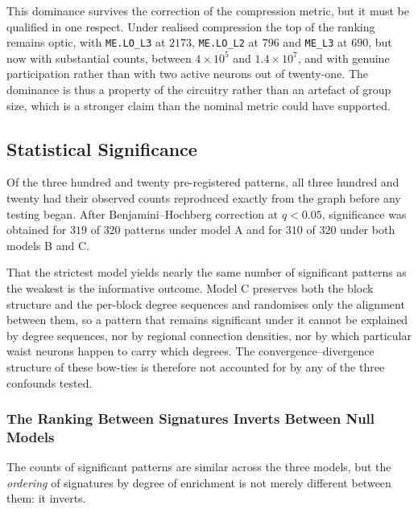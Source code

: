 \documentclass[12pt,a4paper,oneside]{article}
\theoremstyle{definition}
\theoremstyle{plain}
\newcommand{\code}[1]{\texttt{#1}}
\begin{document}
This dominance survives the correction of the compression metric, but it
must be qualified in one respect. Under realised compression the top of the
ranking remains optic, with \code{ME.LO\_L3} at $2173$, \code{ME.LO\_L2} at
$796$ and \code{ME\_L3} at $690$, but now with substantial counts, between
$4 \times 10^{5}$ and $1.4 \times 10^{7}$, and with genuine participation
rather than with two active neurons out of twenty-one. The dominance is thus
a property of the circuitry rather than an artefact of group size, which is
a stronger claim than the nominal metric could have supported.

\subsection{Statistical Significance}
\label{sec:results-validation}

Of the three hundred and twenty pre-registered patterns, all three hundred
and twenty had their observed counts reproduced exactly from the graph
before any testing began. After Benjamini--Hochberg correction at
$q < 0.05$, significance was obtained for $319$ of $320$ patterns under
model A and for $310$ of $320$ under both models B and C.

That the strictest model yields nearly the same number of significant
patterns as the weakest is the informative outcome. Model C preserves both
the block structure and the per-block degree sequences and randomises only
the alignment between them, so a pattern that remains significant under it
cannot be explained by degree sequences, nor by regional connection
densities, nor by which particular waist neurons happen to carry which
degrees. The convergence--divergence structure of these bow-ties is
therefore not accounted for by any of the three confounds tested.

\subsubsection{The Ranking Between Signatures Inverts Between Null Models}
\label{sec:null-inversion}

The counts of significant patterns are similar across the three models, but
the \emph{ordering} of signatures by degree of enrichment is not merely
different between them: it inverts.
\end{document}
